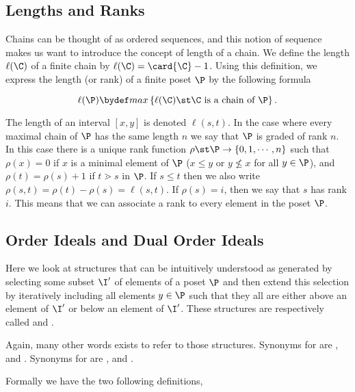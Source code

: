 \subsection*{Lengths and Ranks}

Chains can be thought of as ordered sequences, and this notion of sequence makes
us want to introduce the concept of length of a chain. We define the length
$\ell(\C)$ of a finite chain by $\ell(\C) = \card{\C} - 1$. Using this definition, we
express the length (or rank) of a finite poset $\P$ by the following formula

\begin{displaymath}
\ell(\P) \bydef max\left\{{\ell(\C) \st \C ~\text{is a chain of}~ \P}\right\}.
\end{displaymath}

The length of an interval $[x, y]$ is denoted $\ell(s, t)$. In the case where
every maximal chain of $\P$ has the same length $n$ we say that $\P$ is graded of
rank $n$. In this case there is a unique rank function $\rho \st \P \to \left\{{0,
1, \cdots , n}\right\}$ such that $\rho(x) = 0$ if $x$ is a minimal element of
$\P$ ($x \le y$ or $y \nleq x$ for all $y \in \P$), and $\rho(t) = \rho(s) + 1$
if $t \gtrdot s$ in $\P$. If $s \le t$ then we also write $\rho(s, t) = \rho(t)
- \rho(s) = \ell(s, t)$. If $\rho(s) = i$, then we say that $s$ has rank $i$.
This means that we can associate a rank to every element in the poset $\P$.


\subsection*{Order Ideals and Dual Order Ideals}

Here we look at structures that can be intuitively understood as generated by
selecting some subset $\I'$ of elements of a poset $\P$ and then extend this
selection by iteratively including all elements $y \in \P$ such that they all
are either above an element of $\I'$ or below an element of $\I'$. These
structures are respectively called  and .

Again, many other words exists to refer to those structures. Synonyms for
 are ,  and
. Synonyms for  are
,  and .

Formally we have the two following definitions,

